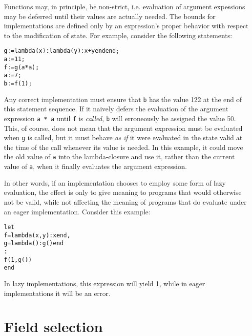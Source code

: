\begin{implementation}
  Functions may, in principle, be non-strict, i.e.  evaluation of
  argument expessions may be deferred until their values are actually
  needed. The bounds for implementations are defined only by an
  expression's proper behavior with respect to the modification of
  state. For example, consider the following statements:
  \begin{alltt} g := lambda (x) : lambda (y) : x + y end end;
 a := 11;
 f := g (a * a);
 a := 7;
 b := f(1);\end{alltt}
  Any correct implementation must ensure that {\tt b} has the value
  122 at the end of this statement sequence. If it naively defers the
  evaluation of the argument expression {\tt a * a} until {\tt f} is
  {\em called}, {\tt b} will erroneously be assigned the value 50. This, of
  course, does not mean that the argument expression must be evaluated
  when {\tt g} is called, but it must behave {\em as if} it were
  evaluated in the state valid at the time of the call whenever 
  its value is needed. In this example, it could move
  the old value of {\tt a} into the lambda-closure and use it, rather
  than the current value of {\tt a}, when it finally evaluates the
  argument expression.
  
  In other words, if an implementation chooses to employ some form of
  lazy evaluation, the effect is only to give meaning to programs that
  would otherwise not be valid, while not affecting the meaning of
  programs that do evaluate under an eager implementation. Consider
  this example:
  \begin{alltt}let 
  f = lambda (x, y) : x end,
  g = lambda () : g() end
:
  f(1, g())
end\end{alltt}
  In lazy implementations, this expression will yield 1, while in
  eager implementations it will be an error.
\end{implementation}



\section{Field selection}\label{sect:SelectorExpr}

